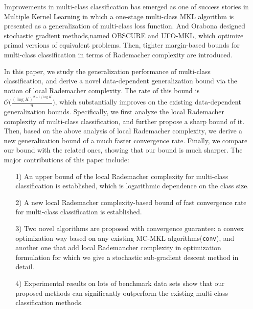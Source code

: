 \documentclass{article}
\begin{document}
Improvements in multi-class classification has emerged as one of success stories in Multiple Kernel Learning\cite{ZienO2007} in which a one-stage multi-class MKL algorithm is presented as a generalization of multi-class loss function\cite{CrammerS02,TsochantaridisHJA04}. And Orabona designed stochastic gradient methods,named
OBSCURE\cite{OrabonaJC10} and
UFO-MKL\cite{OrabonaL11}, which optimize primal versions of equivalent problems. Then, tighter margin-based bounds for multi-class classification in terms of Rademacher complexity are introduced\cite{mohri2012foundations,cortes2013multi}.

In this paper, we  study the generalization performance of multi-class classification,
and derive a novel data-dependent generalization bound via the notion of local Rademacher complexity.
The rate of this bound is $\mathcal{O}\big(\frac{(\log K)^{2+{1}/{\log K}}}{n}\big)$,
which substantially improves on  the existing data-dependent generalization bounds.
Specifically, we first analyze the local Rademacher complexity of multi-class classification,
and further propose a sharp bound of it.
Then, based on the above analysis of local Rademacher complexity,
we derive a new generalization bound of a much faster convergence rate.
Finally, we compare our bound with the related ones,
showing that our bound is much sharper.
The major contributions of this paper include:
\begin{itemize}
  \item[1)]
    An upper bound of the local Rademacher complexity for multi-class classification is established,
    which is logarithmic dependence on the class size.
  \item[2)] A new local Rademacher complexity-based bound of fast convergence rate for multi-class classification is established.
  \item[3)] Two novel algorithms are proposed with convergence guarantee: a convex optimization way based on any existing MC-MKL algorithms(\texttt{conv}), and another one that add local Rademancher complexity in optimization formulation for which we give a stochastic sub-gradient descent method in detail.
  \item[4)] Experimental results on lots of benchmark data sets show that our proposed methods can significantly outperform the existing multi-class classification methods.
\end{itemize}
\end{document}
